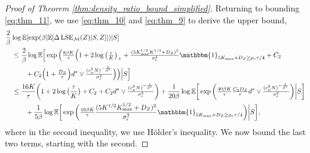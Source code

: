\documentclass[10pt]{article}
\theoremstyle{plain}
\theoremstyle{definition}
\theoremstyle{remark}
\newcommand{\M}{{\mathcal{M}}}
\newcommand{\lse}{\operatorname{LSE}}
\newcommand{\E}{\mathbb{E}}
\begin{document}
\begin{proof}[Proof of Theorem \ref{thm:density_ratio_bound_simplified}]
Returning to bounding \eqref{eq:thm_11}, we use \eqref{eq:thm_10} and \eqref{eq:thm_9} to derive the upper bound,
\begin{align}
    &\frac{2}{\beta} \log \E[\exp (\beta | \E[\Delta \lse_\M(Z)|S, Z] |) | S]\nonumber\\
    & \quad \leq \frac{2}{\beta} \log \E \Big [ \exp \Big ( \tfrac{8 \beta K}{\tau} \Big ( 1 + 2\log \big ( \tfrac{\tau}{K} \big )_+ + \tfrac{(5K_{\max}^{1/2} K^{1/2} + D_Z)^2}{\sigma_\epsilon^2} \mathbbm{1}_{5 K_{\max} + D_Z \geq \mu_\epsilon \tau / 4} + C_2 \nonumber\\
    & \qquad \quad + C_2 \Big ( 1 + \tfrac{D_Z}{\tau} \Big ) d^* \vee \tfrac{(c_\mu^2 N)^{-\frac{1}{d^*}}}{\sigma_\epsilon^{2}} \Big ) \Big ) \Big | S \Big ]\nonumber\\
    & \quad \leq \frac{16 K}{\tau} \bigg ( 1 + 2 \log \big ( \frac{\tau}{K} \big ) + C_2 + C_2 d^* \vee \tfrac{(c_\mu^2 N)^{-\frac{1}{d^*}}}{\sigma_\epsilon^{2}} \bigg ) + \frac{1}{20\beta} \log \E \bigg [ \exp \bigg ( \tfrac{40\beta K}{\tau} \tfrac{C_2 D_Z}{\tau} d^* \vee \tfrac{(c_\mu^2 N)^{-\frac{1}{d^*}}}{\sigma_\epsilon^{2}} \bigg ) \bigg | S \bigg ]\nonumber\\
    & \quad \qquad + \frac{1}{5\beta} \log \E \bigg [ \exp \bigg ( \tfrac{10\beta K}{\tau} \frac{(5 K^{1/2} K_{\max}^{1/2} + D_Z)^2}{\sigma^2_\epsilon} \mathbbm{1}_{5 K_{\max} + D_Z \geq \mu_\epsilon \tau / 4} \bigg ) \bigg | S \bigg ],\label{eq:thm1_2}
\end{align}
where in the second inequality, we use H\"older's inequality.
We now bound the last two terms, starting with the second.


\end{proof}
\end{document}
